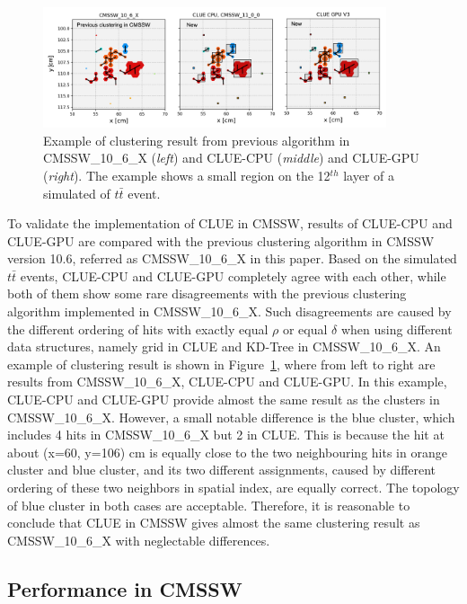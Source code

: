 \begin{figure}[ht]
    \centering
    \includegraphics[trim=0cm 0cm 0cm 0cm, clip, width=0.90\textwidth]{chapters/HGCal/figures/chep/results.png}
    \caption{ Example of clustering result from previous algorithm in CMSSW\_10\_6\_X (\emph{left}) and CLUE-CPU (\emph{middle}) and CLUE-GPU (\emph{right}). The example shows a small region on the 12$^{th}$ layer of a simulated of $t\bar{t}$ event.
    }
    \label{fig:results}
\end{figure}

To validate the implementation of CLUE in CMSSW, results of CLUE-CPU and CLUE-GPU are compared with the previous clustering algorithm in CMSSW version 10.6, referred as CMSSW\_10\_6\_X in this paper. Based on the simulated $t\bar{t}$ events, CLUE-CPU and CLUE-GPU completely agree with each other, while both of them show some rare disagreements with the previous clustering algorithm implemented in CMSSW\_10\_6\_X. Such disagreements are caused by the different ordering of hits with exactly equal $\rho$ or equal $\delta$ when using different data structures, namely grid in CLUE and KD-Tree in CMSSW\_10\_6\_X. An example of clustering result is shown in Figure~\ref{fig:results}, where from left to right are results from CMSSW\_10\_6\_X, CLUE-CPU and CLUE-GPU. In this example, CLUE-CPU and CLUE-GPU provide almost the same result as the clusters in CMSSW\_10\_6\_X. However, a small notable difference is the blue cluster, which includes 4 hits in CMSSW\_10\_6\_X but 2 in CLUE. This is because the hit at about (x=60, y=106) cm is equally close to the two neighbouring hits in orange cluster and blue cluster, and its two different assignments, caused by different ordering of these two neighbors in spatial index, are equally correct. The topology of blue cluster in both cases are acceptable. Therefore, it is reasonable to conclude that CLUE in CMSSW gives almost the same clustering result as CMSSW\_10\_6\_X with neglectable differences.





\subsection{Performance in CMSSW}
\label{sec:performance}


